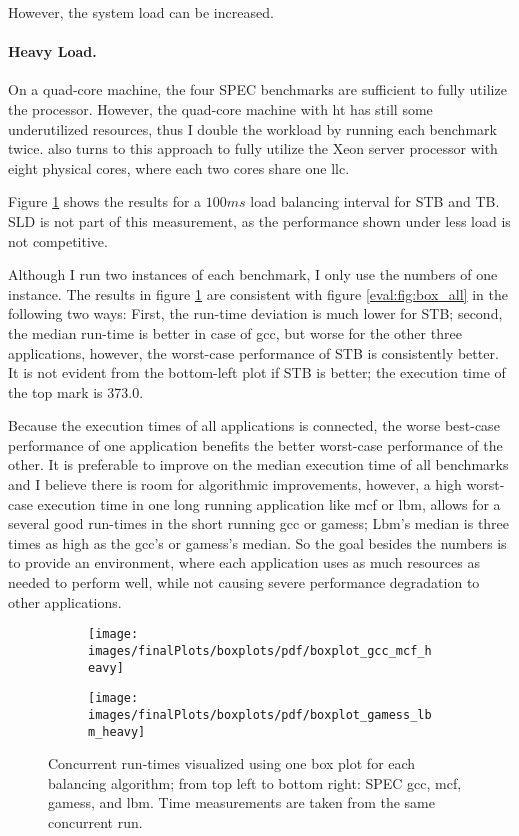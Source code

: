 However, the system load can be increased.


\paragraph{Heavy Load.}
On a quad-core machine, the four SPEC benchmarks are sufficient to fully
utilize the processor.
However, the quad-core machine with \gls{ht} has still some underutilized
resources, thus I double the workload by running each benchmark twice.
\cite{zhuravlev_addressing_2010} also turns to this approach to fully utilize
the Xeon server processor with eight physical cores, where each two cores share
one \gls{llc}.

Figure \ref{eval:fig:box_heavy} shows the results for a $100ms$ load balancing
interval for STB and TB. SLD is not part of this measurement, as the
performance shown under less load is not competitive.

Although I run two instances of each benchmark, I only use the numbers of one
instance.
The results in figure \ref{eval:fig:box_heavy} are consistent with figure
\ref{eval:fig:box_all} in the following two ways:
First, the run-time deviation is much lower for STB; second, the median
run-time is better in case of gcc, but worse for the other three applications,
however, the worst-case performance of STB is consistently better.
It is not evident from the bottom-left plot if STB is better; the
execution time of the top mark is 373.0.

Because the execution times of all applications is connected, the worse
best-case performance of one application benefits the better worst-case
performance of the other.
It is preferable to improve on the median execution time of all benchmarks and
I believe there is room for algorithmic improvements, however, a high
worst-case execution time in one long running application like mcf or lbm, allows for a
several good run-times in the short running gcc or gamess; Lbm's median is
three times as high as the gcc's or gamess's median.
So the goal besides the numbers is to provide an environment, where each
application uses as much resources as needed to perform well, while not causing
severe performance degradation to other applications.
%
\begin{figure}[h!]
  \begin{subfigure}{\textwidth}
  \texttt{[image: images/finalPlots/boxplots/pdf/boxplot\_gcc\_mcf\_heavy]}
  \end{subfigure}
  \begin{subfigure}{\textwidth}
  \texttt{[image: images/finalPlots/boxplots/pdf/boxplot\_gamess\_lbm\_heavy]}
  \end{subfigure}
  \caption{Concurrent run-times visualized using one box plot for each balancing
    algorithm; from top left to bottom right: SPEC gcc, mcf, gamess, and lbm.
    Time measurements are taken from the same concurrent run.}
    \label{eval:fig:box_heavy}
\end{figure}

